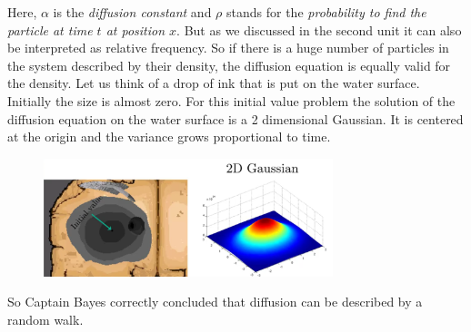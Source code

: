 \documentclass[12pt, a4paper]{scrartcl}
\begin{document}
Here, $\alpha$ is the \textit{diffusion constant} and $\rho$ stands for the \textit{probability to find the particle at time $t$ at position $x$}. But as we discussed in the second unit it can also be interpreted as relative frequency. So if there is a huge number of particles in the system described by their density, the diffusion equation is equally valid for the density.
Let us think of a drop of ink that is put on the water surface. Initially the size is almost zero. 
For this initial value problem the solution of the diffusion equation on the water surface is a 2 dimensional Gaussian.
It is centered at the origin and the variance grows proportional to time. %
 \begin{figure}[H]
	\centering
	\includegraphics[width=0.75\textwidth]{5_4.png}
\end{figure}
So Captain Bayes correctly concluded that diffusion can be described by a random walk.\\
\end{document}
